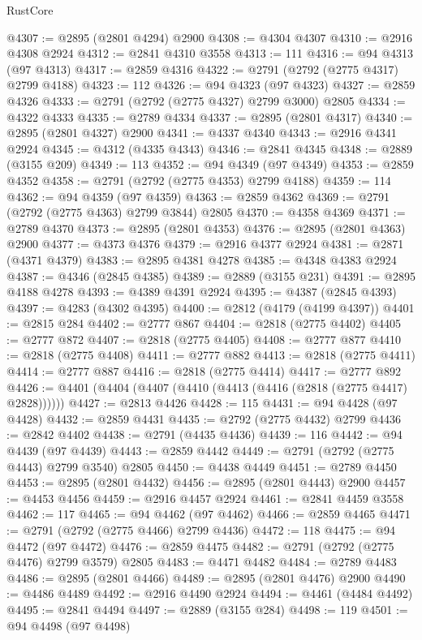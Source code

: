 \begin{lexlean}{RustCore}
\begin{coremodule}
@4307 := @2895 (@2801 @4294) @2900
@4308 := @4304 @4307
@4310 := @2916 @4308 @2924
@4312 := @2841 @4310 @3558
@4313 := 111
@4316 := @94 @4313 (@97 @4313)
@4317 := @2859 @4316
@4322 := @2791 (@2792 (@2775 @4317) @2799 @4188)
@4323 := 112
@4326 := @94 @4323 (@97 @4323)
@4327 := @2859 @4326
@4333 := @2791 (@2792 (@2775 @4327) @2799 @3000) @2805
@4334 := @4322 @4333
@4335 := @2789 @4334
@4337 := @2895 (@2801 @4317)
@4340 := @2895 (@2801 @4327) @2900
@4341 := @4337 @4340
@4343 := @2916 @4341 @2924
@4345 := @4312 (@4335 @4343)
@4346 := @2841 @4345
@4348 := @2889 (@3155 @209)
@4349 := 113
@4352 := @94 @4349 (@97 @4349)
@4353 := @2859 @4352
@4358 := @2791 (@2792 (@2775 @4353) @2799 @4188)
@4359 := 114
@4362 := @94 @4359 (@97 @4359)
@4363 := @2859 @4362
@4369 := @2791 (@2792 (@2775 @4363) @2799 @3844) @2805
@4370 := @4358 @4369
@4371 := @2789 @4370
@4373 := @2895 (@2801 @4353)
@4376 := @2895 (@2801 @4363) @2900
@4377 := @4373 @4376
@4379 := @2916 @4377 @2924
@4381 := @2871 (@4371 @4379)
@4383 := @2895 @4381 @4278
@4385 := @4348 @4383 @2924
@4387 := @4346 (@2845 @4385)
@4389 := @2889 (@3155 @231)
@4391 := @2895 @4188 @4278
@4393 := @4389 @4391 @2924
@4395 := @4387 (@2845 @4393)
@4397 := @4283 (@4302 @4395)
@4400 := @2812 (@4179 (@4199 @4397))
@4401 := @2815 @284
@4402 := @2777 @867
@4404 := @2818 (@2775 @4402)
@4405 := @2777 @872
@4407 := @2818 (@2775 @4405)
@4408 := @2777 @877
@4410 := @2818 (@2775 @4408)
@4411 := @2777 @882
@4413 := @2818 (@2775 @4411)
@4414 := @2777 @887
@4416 := @2818 (@2775 @4414)
@4417 := @2777 @892
@4426 := @4401 (@4404 (@4407 (@4410 (@4413 (@4416 (@2818 (@2775 @4417) @2828))))))
@4427 := @2813 @4426
@4428 := 115
@4431 := @94 @4428 (@97 @4428)
@4432 := @2859 @4431
@4435 := @2792 (@2775 @4432) @2799
@4436 := @2842 @4402
@4438 := @2791 (@4435 @4436)
@4439 := 116
@4442 := @94 @4439 (@97 @4439)
@4443 := @2859 @4442
@4449 := @2791 (@2792 (@2775 @4443) @2799 @3540) @2805
@4450 := @4438 @4449
@4451 := @2789 @4450
@4453 := @2895 (@2801 @4432)
@4456 := @2895 (@2801 @4443) @2900
@4457 := @4453 @4456
@4459 := @2916 @4457 @2924
@4461 := @2841 @4459 @3558
@4462 := 117
@4465 := @94 @4462 (@97 @4462)
@4466 := @2859 @4465
@4471 := @2791 (@2792 (@2775 @4466) @2799 @4436)
@4472 := 118
@4475 := @94 @4472 (@97 @4472)
@4476 := @2859 @4475
@4482 := @2791 (@2792 (@2775 @4476) @2799 @3579) @2805
@4483 := @4471 @4482
@4484 := @2789 @4483
@4486 := @2895 (@2801 @4466)
@4489 := @2895 (@2801 @4476) @2900
@4490 := @4486 @4489
@4492 := @2916 @4490 @2924
@4494 := @4461 (@4484 @4492)
@4495 := @2841 @4494
@4497 := @2889 (@3155 @284)
@4498 := 119
@4501 := @94 @4498 (@97 @4498)

\end{coremodule}
\end{lexlean}
